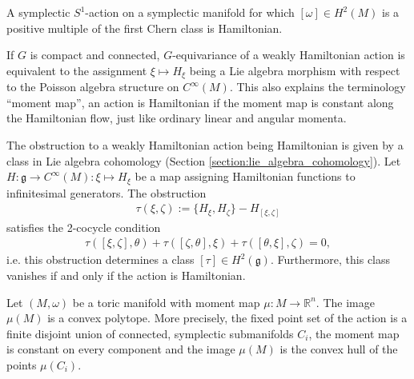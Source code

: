     \begin{property}
        A symplectic $S^1$-action on a symplectic manifold for which $[\omega]\in H^2(M)$ is a positive multiple of the first Chern class is Hamiltonian.
    \end{property}

    \begin{property}[Obstruction]
        If $G$ is compact and connected, $G$-equivariance of a weakly Hamiltonian action is equivalent to the assignment $\xi\mapsto H_\xi$ being a Lie algebra morphism with respect to the Poisson algebra structure on $C^\infty(M)$. This also explains the terminology ``moment map'', an action is Hamiltonian if the moment map is constant along the Hamiltonian flow, just like ordinary linear and angular momenta.

        The obstruction to a weakly Hamiltonian action being Hamiltonian is given by a class in Lie algebra cohomology (Section \ref{section:lie_algebra_cohomology}). Let $H:\mathfrak{g}\rightarrow C^\infty(M):\xi\mapsto H_\xi$ be a map assigning Hamiltonian functions to infinitesimal generators. The obstruction
        \begin{gather}
            \tau(\xi,\zeta) := \{H_\xi,H_\zeta\} - H_{[\xi,\zeta]}
        \end{gather}
        satisfies the 2-cocycle condition
        \begin{gather}
            \tau([\xi,\zeta],\theta) + \tau([\zeta,\theta],\xi) + \tau([\theta,\xi],\zeta) = 0,
        \end{gather}
        i.e. this obstruction determines a class $[\tau]\in H^2(\mathfrak{g})$. Furthermore, this class vanishes if and only if the action is Hamiltonian.
    \end{property}

    \begin{theorem}
        Let $(M,\omega)$ be a toric manifold with moment map $\mu:M\rightarrow\mathbb{R}^n$. The image $\mu(M)$ is a convex polytope. More precisely, the fixed point set of the action is a finite disjoint union of connected, symplectic submanifolds $C_i$, the moment map is constant on every component and the image $\mu(M)$ is the convex hull of the points $\mu(C_i)$.
    \end{theorem}

